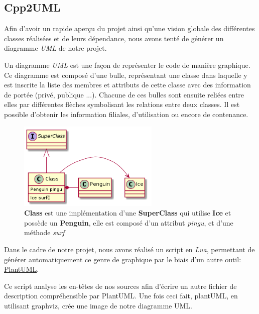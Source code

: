 \subsection{Cpp2UML}

Afin d'avoir un rapide aperçu du projet ainsi qu'une vision globale des différentes classes réalisées et de leurs dépendance,
nous avons tenté de générer un diagramme \textit{UML} de notre projet.

Un diagramme \textit{UML} est une façon de représenter le code de manière graphique.
Ce diagramme est composé d'une bulle, représentant une classe dans laquelle y est inscrite la liste des membres et attributs de cette classe avec des information de portée (privé, publique ...).
Chacune de ces bulles sont ensuite reliées entre elles par différentes flèches symbolisant les relations entre deux classes. Il est possible d'obtenir les information filiales, d'utilisation ou encore de contenance.

\begin{figure}[h!]
	\centering
	\includegraphics[width=0.6\textwidth]{img/uml_example.png}
	\caption{\textbf{Class} est une implémentation d'une \textbf{SuperClass} qui utilise \textbf{Ice} et possède un \textbf{Penguin}, elle est composé d'un attribut \textit{pingu}, et d'une méthode \textit{surf}}
\end{figure}

Dans le cadre de notre projet, nous avons réalisé un script en \textit{Lua},
permettant de générer automatiquement ce genre de graphique par le biais d'un autre outil:
\href{http://plantuml.sourceforge.net/}{PlantUML}.

Ce script analyse les en-têtes de nos sources afin d'écrire un autre fichier de description compréhensible par PlantUML. Une fois ceci fait,  plantUML, en utilisant graphviz, crée une image de notre diagramme UML.
